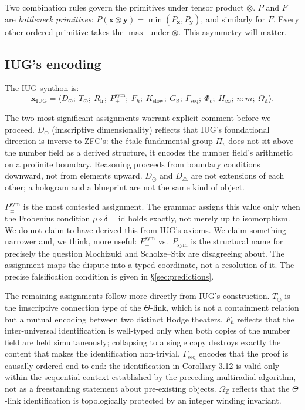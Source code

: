 \documentclass[12pt]{article}
\theoremstyle{plain}
\theoremstyle{definition}
\theoremstyle{remark}
\newcommand{\bZ}{\mathbb{Z}}
\begin{document}
Two combination rules govern the primitives under tensor product $\otimes$.
$P$ and $F$ are \emph{bottleneck primitives}: $P(\mathbf{x} \otimes \mathbf{y}) = \min(P_\mathbf{x}, P_\mathbf{y})$,
and similarly for $F$. Every other ordered primitive takes the $\max$ under $\otimes$.
This asymmetry will matter.

\subsection{IUG's encoding}
\label{subsec:iug-encoding}

The IUG synthon is:
\[
  \mathbf{x}_\text{IUG} = \langle D_\odot;\ T_\odot;\ R_\text{lr};\ P_\pm^\text{sym};\ F_\hbar;\ K_\text{slow};\ G_\aleph;\ \Gamma_\text{seq};\ \Phi_c;\ H_\infty;\ n{:}m;\ \Omega_\bZ \rangle.
\]

The two most significant assignments warrant explicit comment before we proceed. $D_\odot$
(imscriptive dimensionality) reflects that IUG's foundational direction is inverse to ZFC's:
the \'etale fundamental group $\Pi_v$ does not sit above the number field as a derived structure,
it encodes the number field's arithmetic on a profinite boundary. Reasoning proceeds from
boundary conditions downward, not from elements upward. $D_\odot$ and $D_\triangle$ are
not extensions of each other; a hologram and a blueprint are not the same kind of object.

$P_\pm^\text{sym}$ is the most contested assignment. The grammar assigns this value only when
the Frobenius condition $\mu \circ \delta = \text{id}$ holds exactly, not merely up to
isomorphism. We do not claim to have derived this from IUG's axioms. We claim something
narrower and, we think, more useful: $P_\pm^\text{sym}$ vs.\ $P_\text{sym}$ is the
structural name for precisely the question Mochizuki and Scholze--Stix are disagreeing about.
The assignment maps the dispute into a typed coordinate, not a resolution of it. The precise
falsification condition is given in \S\ref{sec:predictions}.

The remaining assignments follow more directly from IUG's construction. $T_\odot$ is the
imscriptive connection type of the $\Theta$-link, which is not a containment relation but
a mutual encoding between two distinct Hodge theaters. $F_\hbar$ reflects that the
inter-universal identification is well-typed only when both copies of the number field are
held simultaneously; collapsing to a single copy destroys exactly the content that makes
the identification non-trivial. $\Gamma_\text{seq}$ encodes that the proof is causally
ordered end-to-end: the identification in Corollary 3.12 is valid only within the sequential
context established by the preceding multiradial algorithm, not as a freestanding statement
about pre-existing objects. $\Omega_\bZ$ reflects that the $\Theta$-link identification
is topologically protected by an integer winding invariant.
\end{document}
